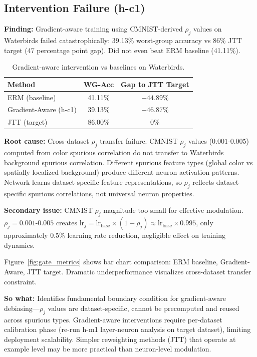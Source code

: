 \subsection{Intervention Failure (h-c1)}

\textbf{Finding:} Gradient-aware training using CMNIST-derived $\rho_j$ values on Waterbirds failed catastrophically: 39.13\% worst-group accuracy vs 86\% JTT target (47 percentage point gap). Did not even beat ERM baseline (41.11\%).

\begin{table}[h]
\centering
\begin{tabular}{@{}lcc@{}}
\toprule
\textbf{Method} & \textbf{WG-Acc} & \textbf{Gap to JTT Target} \\
\midrule
ERM (baseline) & 41.11\% & $-44.89\%$ \\
Gradient-Aware (h-c1) & 39.13\% & $-46.87\%$ \\
JTT (target) & 86.00\% & 0\% \\
\bottomrule
\end{tabular}
\caption{Gradient-aware intervention vs baselines on Waterbirds.}
\label{tab:intervention}
\end{table}

\textbf{Root cause:} Cross-dataset $\rho_j$ transfer failure. CMNIST $\rho_j$ values ($0.001$-$0.005$) computed from color spurious correlation do not transfer to Waterbirds background spurious correlation. Different spurious feature types (global color vs spatially localized background) produce different neuron activation patterns. Network learns dataset-specific feature representations, so $\rho_j$ reflects dataset-specific spurious correlations, not universal neuron properties.

\textbf{Secondary issue:} CMNIST $\rho_j$ magnitude too small for effective modulation. $\rho_j = 0.001$-$0.005$ creates $\text{lr}_j = \text{lr}_{\text{base}} \times (1 - \rho_j) \approx \text{lr}_{\text{base}} \times 0.995$, only approximately 0.5\% learning rate reduction, negligible effect on training dynamics.

Figure~\ref{fig:gate_metrics} shows bar chart comparison: ERM baseline, Gradient-Aware, JTT target. Dramatic underperformance visualizes cross-dataset transfer constraint.

\textbf{So what:} Identifies fundamental boundary condition for gradient-aware debiasing---$\rho_j$ values are dataset-specific, cannot be precomputed and reused across spurious types. Gradient-aware interventions require per-dataset calibration phase (re-run h-m1 layer-neuron analysis on target dataset), limiting deployment scalability. Simpler reweighting methods (JTT) that operate at example level may be more practical than neuron-level modulation.

